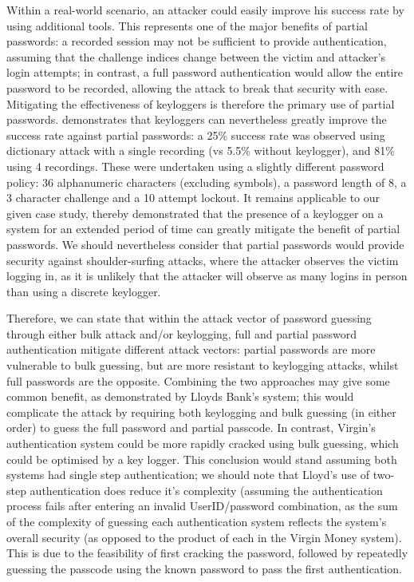 \documentclass[british,10pt,a4paper]{article}
\begin{document}
Within a real-world scenario, an attacker could easily improve his success rate by using additional tools. This represents one of the major benefits of partial passwords: a recorded session may not be sufficient to provide authentication, assuming that the challenge indices change between the victim and attacker's login attempts; in contrast, a full password authentication would allow the entire password to be recorded, allowing the attack to break that security with ease. Mitigating the effectiveness of keyloggers is therefore the primary use of partial passwords. \citet{Aspinall2013-sh} demonstrates that keyloggers can nevertheless greatly improve the success rate against partial passwords: a 25\% success rate was observed using dictionary attack with a single recording (vs 5.5\% without keylogger), and 81\% using 4 recordings. These were undertaken using a slightly different password policy: 36 alphanumeric characters (excluding symbols), a password length of 8, a 3 character challenge and a 10 attempt lockout. It remains applicable to our given case study, thereby demonstrated that the presence of a keylogger on a system for an extended period of time can greatly mitigate the benefit of partial passwords. We should nevertheless consider that partial passwords would provide security against shoulder-surfing attacks, where the attacker observes the victim logging in, as it is unlikely that the attacker will observe as many logins in person than using a discrete keylogger. 

Therefore, we can state that within the attack vector of password guessing through either bulk attack and/or keylogging, full and partial password authentication mitigate different attack vectors: partial passwords are more vulnerable to bulk guessing, but are more resistant to keylogging attacks, whilst full passwords are the opposite. Combining the two approaches may give some common benefit, as demonstrated by Lloyds Bank's system; this would complicate the attack by requiring both keylogging and bulk guessing (in either order) to guess the full password and partial passcode. In contrast, Virgin's authentication system could be more rapidly cracked using bulk guessing, which could be optimised by a key logger. This conclusion would stand assuming both systems had single step authentication; we should note that Lloyd's use of two-step authentication does reduce it's complexity (assuming the authentication process fails after entering an invalid UserID/password combination, as the sum of the complexity of guessing each authentication system reflects the system's overall security (as opposed to the product of each in the Virgin Money system). This is due to the feasibility of first cracking the password, followed by repeatedly guessing the passcode using the known password to pass the first authentication.
\end{document}
